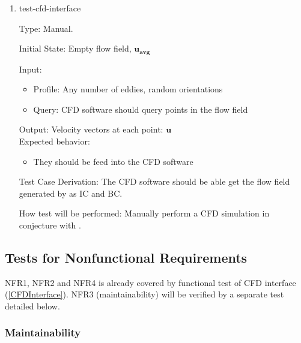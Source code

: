 \documentclass[12pt, titlepage]{article}
\begin{document}
\begin{enumerate}

  \item{test-cfd-interface\\}
  
  Type: Manual.
            
  Initial State: Empty flow field, $\mathbf{u_{avg}}$
            
  Input:
  \begin{itemize}
    \item Profile: Any number of eddies, random orientations
    \item Query: CFD software should query points in the flow field
  \end{itemize}
  Output: Velocity vectors at each point: $\mathbf{u}$\\
  Expected behavior:
  \begin{itemize}
    \item They should be feed into the CFD software
  \end{itemize}

  Test Case Derivation: The CFD software should be able get the flow field generated by \progname{} as IC and BC.

  How test will be performed: Manually perform a CFD simulation in conjecture with  \progname{}.
\end{enumerate}

\newpage
\subsection{Tests for Nonfunctional Requirements} \label{NonfuncTest}
NFR1, NFR2 and NFR4 is already covered by functional test of CFD interface (\ref{CFDInterface}). NFR3 (maintainability) will be verified by a separate test detailed below.



\subsubsection{Maintainability} \label{MaintTest}
		
\end{document}
